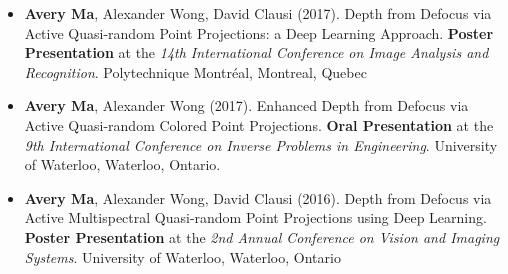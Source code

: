 \begin{adjustwidth}{\indentleft}{\indentright}
\begin{itemize}
    \item \textbf{Avery Ma}, Alexander Wong, David Clausi (2017). Depth from Defocus via Active Quasi-random Point Projections: a Deep Learning Approach. \textbf{Poster Presentation} at the \emph{14th International Conference on Image Analysis and Recognition}. Polytechnique Montréal, Montreal, Quebec
    
    \item \textbf{Avery Ma}, Alexander Wong (2017). Enhanced Depth from Defocus via Active Quasi-random Colored Point Projections. \textbf{Oral Presentation} at the \emph{9th International Conference on Inverse Problems in Engineering}. University of Waterloo, Waterloo, Ontario.
    
    \item \textbf{Avery Ma}, Alexander Wong, David Clausi (2016). Depth from Defocus via Active Multispectral Quasi-random Point Projections using Deep Learning. \textbf{Poster Presentation} at the \emph{2nd Annual Conference on Vision and Imaging Systems}. University of Waterloo, Waterloo, Ontario
\end{itemize}
\end{adjustwidth}
